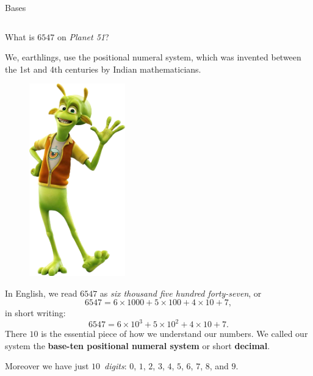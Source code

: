 \documentclass[9pt,aspectratio=169]{beamer}
\begin{document}
\begin{frame}{Bases}
  \begin{columns}[T]
    \begin{column}{0.5\textwidth}
      \begin{problem}
        What is $6547$ on \emph{Planet 51}? 
      \end{problem}

      We, earthlings, use the positional numeral system, which was invented between the 1st and 4th centuries by Indian mathematicians. 
      \begin{figure}
        \vspace*{-1.5em}
        \hspace*{-1.5em}
        \includegraphics[width=0.37\textwidth]{05 - Number Theory 102/alien.png}
      \end{figure}
      In English, we read $6547$ as \emph{six thousand five hundred forty-seven}, or
      \[ 6547 = 6 \times 1000 + 5 \times 100 + 4 \times 10 + 7, \]
      in short writing:
      \[  6547 = 6 \times 10^3 + 5 \times 10^2 + 4 \times 10 + 7. \]
      There $10$ is the essential piece of how we understand our numbers. We called our system the \textbf{base-ten positional numeral system} or short \textbf{decimal}.
      
      Moreover we have just $10$~\emph{digits}: $0$, $1$, $2$, $3$, $4$, $5$, $6$, $7$, $8$, and $9$.


\end{column}
\end{columns}
\end{frame}
\end{document}
